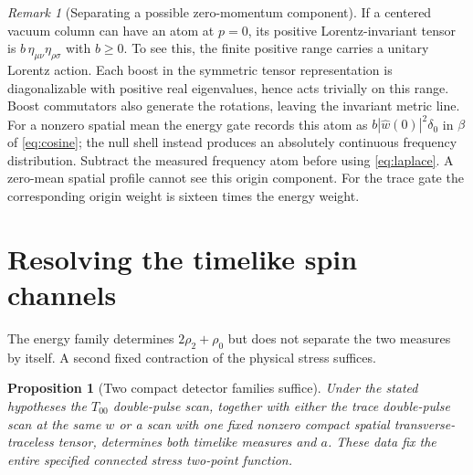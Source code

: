 \documentclass[11pt]{article}
\newtheorem{proposition}[theorem]{Proposition}
\theoremstyle{remark}
\newtheorem{remark}[theorem]{Remark}
\begin{document}
\begin{remark}[Separating a possible zero-momentum component]
If a centered vacuum column can have an atom at \(p=0\), its
positive Lorentz-invariant tensor is \(b\,\eta_{\mu\nu}
\eta_{\rho\sigma}\) with \(b\ge0\). To see this, the finite
positive range carries a unitary Lorentz action. Each boost in
the symmetric tensor representation is diagonalizable with
positive real eigenvalues, hence acts trivially on this range.
Boost commutators also generate the rotations, leaving the
invariant metric line. For a nonzero spatial mean the energy
gate records this atom as \(b|\widehat w(0)|^2\delta_0\)
in \(\beta\) of \eqref{eq:cosine}; the null shell instead
produces an absolutely continuous frequency distribution.
Subtract the measured frequency atom before using
\eqref{eq:laplace}. A zero-mean spatial profile cannot see
this origin component. For the trace gate the corresponding
origin weight is sixteen times the energy weight.
\end{remark}

\section{Resolving the timelike spin channels}

The energy family determines \(2\rho_2+\rho_0\) but does not
separate the two measures by itself. A second fixed contraction
of the physical stress suffices.

\begin{proposition}[Two compact detector families suffice]
\label{thm:spin}
Under the stated hypotheses the \(T_{00}\) double-pulse scan,
together with either the trace double-pulse scan at the same
\(w\) or a scan with one fixed nonzero compact spatial
transverse-traceless tensor, determines both timelike measures
and \(a\). These data fix the entire specified connected stress
two-point function.
\end{proposition}
\end{document}
